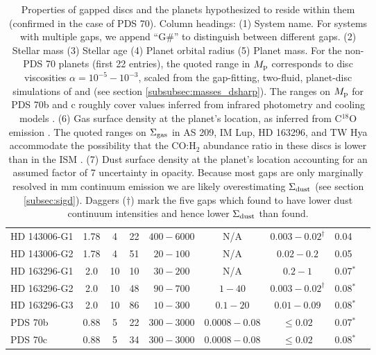 \documentclass[fleqn,usenatbib]{mnras}
\newcommand{\Sigg}{\Sigma_{\rm gas}}
\newcommand{\Sigd}{\Sigma_{\rm dust}}
\begin{document}
\begin{table*}
\begin{tabular}{|l|c|c|c|c|c|c|l|l|}
HD 143006-G1 & 1.78 & 4 & 22 & $400-6000$ &  N/A   & $0.003 - 0.02^{\dagger}$ &  0.04  &  \\ 
HD 143006-G2 & 1.78 & 4 & 51 & $20-100$ &  N/A   & $0.02 - 0.2$ &  0.05  &  \\ 
HD 163296-G1 & 2.0 & 10 & 10 & $30-200$ &  N/A   & $0.2 - 1$ &  0.07$^{\ast}$  &  \\ 
HD 163296-G2 & 2.0 & 10 & 48 & $90-700$ &  $1-40$   & $0.003 - 0.02^{\dagger}$ &  0.08$^{\ast}$  &  \\ 
HD 163296-G3 & 2.0 & 10 & 86 & $10-300$ &  $0.1-20$   & $0.01 - 0.09$ &  0.08$^{\ast}$  &  \\ 
\hline 
PDS 70b & 0.88 & 5 & 22 & $300-3000$ & $0.0008 - 0.08$ & $\leq 0.02$ & 0.07$^{\ast}$ \\ 
PDS 70c & 0.88 & 5 & 34 & $300-3000$ & $0.0008 - 0.08$   & $\leq 0.02$ & 0.08$^{\ast}$ \\ \hline 
\end{tabular}
\caption{Properties of gapped discs and the planets hypothesized to reside within them (confirmed in the case of PDS 70). Column headings: (1) System name. For systems with multiple gaps, we append ``G\#'' to distinguish between different gaps. (2) Stellar mass \protect 
\citep{andrews_etal_2018,  ducourant_etal_2015,oberg_etal_2021,blondel_dije_2006,   keppler_etal_2019} (3) Stellar age \protect \citep{andrews_etal_2018,ducourant_etal_2015, pohl_etal_2017, muller_etal_2018} (4) Planet orbital radius 
\protect \citep{zhang_etal_2018, dong_fung_2017, keppler_etal_2018} 
(5) Planet mass. For the non-PDS 70
planets (first 22 entries), the quoted range in $M_{\rm p}$ corresponds to disc viscosities $\alpha = 10^{-5}-10^{-3}$, scaled from the gap-fitting, two-fluid, planet-disc simulations of \protect \citet{zhang_etal_2018} and \citet{dong_fung_2017} (see section \ref{subsubsec:masses_dsharp}). 
The ranges on $M_{\rm p}$ for PDS 70b and c roughly cover values inferred from infrared photometry and cooling models \protect \citep{muller_etal_2018, keppler_etal_2018, wang_etal_2020}. (6) Gas surface density at the planet's location, as inferred from C$^{18}$O emission \protect \citep{  nomura_etal_2021,zhang_etal_2021, favre_etal_2019, fedele_etal_2017, isella_etal_2016, facchini_etal_2021}. The quoted ranges on $\Sigg$ in AS 209, IM Lup, HD 163296, and TW Hya accommodate the possibility that the CO:H$_2$ abundance ratio in these discs is lower than in the ISM  \protect \citep{zhang_etal_2019,calahan_etal_2020, zhang_etal_2021}. (7) Dust surface density at the planet's location \protect \citep{huang_etal_2018, nomura_etal_2021, fedele_etal_2017, benisty_etal_2021} accounting for an assumed factor of 7 uncertainty in opacity. Because most gaps are only marginally resolved in mm continuum emission we are likely overestimating $\Sigd$ (see section \ref{subsec:sigd}). Daggers ($\dagger$) mark the five gaps which \protect\citet{jennings_etal_2021} found to have lower dust continuum intensities and hence lower $\Sigd$ than \protect\citet{huang_etal_2018} found.
}
\end{table*}
\end{document}
